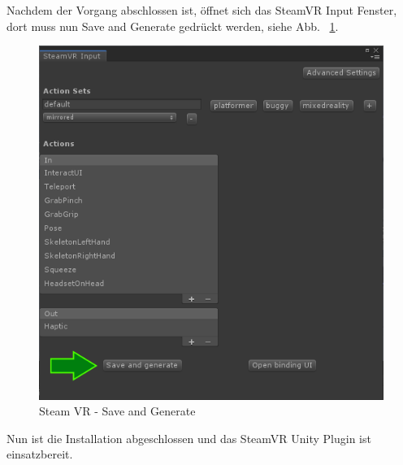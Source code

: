 Nachdem der Vorgang abschlossen ist, öffnet sich das SteamVR Input Fenster, dort muss nun Save and Generate gedrückt werden, siehe Abb. ~\ref{fig:steamvr_save_and_generate}.
\begin {figure}
    \centering
    \includegraphics[scale=0.6]{pics/steamVR-Input-SaveAndGenerate}
    \caption{Steam VR - Save and Generate}
    \label{fig:steamvr_save_and_generate}
\end {figure}
Nun ist die Installation abgeschlossen und das SteamVR Unity Plugin ist einsatzbereit.
~\cite{SteamVR_Quickstart_2022}

